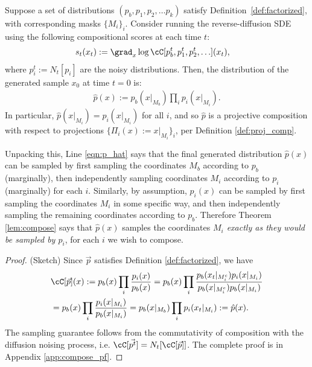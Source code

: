 \begin{theorem}
\label{lem:compose}
Suppose a set of distributions $(p_b, p_1, p_2, \dots p_k)$
satisfy Definition~\ref{def:factorized},
with corresponding masks $\{M_i\}_i$.
Consider running the reverse-diffusion SDE 
using the following compositional scores at each time $t$:
\begin{align}
s_t(x_t) &:= \grad_x \log \cC[p_b^t, p_1^t, p_2^t, \ldots](x_t),
\end{align}
where $p_i^t := N_t[p_i]$ are the noisy distributions.
Then, the distribution of the generated sample $x_0$ at time $t=0$ is:
\begin{align}
\label{eqn:p_hat}
\hat{p}(x) := p_b(x|_{M_b}) \prod_i p_i(x|_{M_i}).
\end{align}
In particular,
$\hat{p}(x|_{M_i}) = p_i(x|_{M_i})$ for all $i$,
and so
$\hat{p}$ is a projective composition
with respect to projections $\{\Pi_i(x) := x|_{M_i}\}_i$,
per Definition \ref{def:proj_comp}.
\end{theorem}




Unpacking this, Line \ref{eqn:p_hat} says that the final generated distribution
$\hat{p}(x)$ can be sampled by
first sampling
the coordinates $M_b$ according to $p_b$ (marginally),
then independently sampling 
coordinates $M_i$ according to $p_i$ (marginally) for each $i$.
Similarly, by assumption, $p_i(x)$ can be sampled by first sampling the coordinates $M_i$ in some specific way, and then independently sampling the remaining coordinates according to $p_b$. Therefore Theorem \ref{lem:compose} says that $\hat{p}(x)$ samples the coordinates \emph{$M_i$ exactly as they would be sampled by $p_i$}, for each $i$ we wish to compose. 

\begin{proof}(Sketch) \small
Since $\vec{p}$ satisfies Definition \ref{def:factorized}, we have
\begin{align*}
&\cC[\vec{p}](x) := p_b(x) \prod_i \frac{p_i(x)}{p_b(x)} \notag 
= p_b(x) \prod_i \frac{p_b(x_t|_{M_i^c}) p_i(x|_{M_i})}{p_b(x|_{M_i^c})p_b(x|_{M_i})} \notag \\
&= p_b(x) \prod_i \frac{p_i(x|_{M_i})}{p_b(x|_{M_i})} \notag 
= p_b(x|_{M_b}) \prod_i p_i(x_t|_{M_i}) := \hat{p}(x).
\end{align*}
The sampling guarantee follows from the commutativity of composition with the diffusion noising process, i.e. $\cC[\vec{p^t}]= N_t[\cC[\vec{p}]]$. 
The complete proof is in Appendix \ref{app:compose_pf}.
\end{proof}

